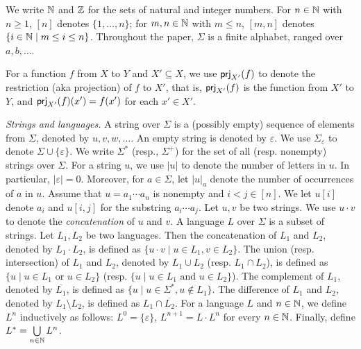 %

We write $\mathbb{N}$ and $\mathbb{Z}$ for the sets of natural and integer numbers. For $n \in \mathbb{N}$ with $n \ge 1$, $[n]$ denotes $\{1, \ldots, n\}$; for $m,n \in \mathbb{N}$ with $m \le n$,  $[m, n]$ denotes $\{ i \in \mathbb{N} \mid m \le i \le n \}$. Throughout the paper, $\Sigma$ is a finite alphabet, ranged over $a,b,\ldots$.  

For a function $f$ from $X$ to $Y$ and $X' \subseteq X$, we use ${\sf prj}_{X'}(f)$ to denote the restriction (aka projection) of $f$ to $X'$, that is, ${\sf prj}_{X'}(f)$ is the function from $X'$ to $Y$, and ${\sf prj}_{X'}(f)(x') = f(x')$ for each $x' \in X'$.

\medskip
\noindent 
\emph{Strings and languages.}
A string over $\Sigma$ is a (possibly empty) sequence of elements from $\Sigma$,
denoted by $u, v, w, \ldots$. An empty string is denoted by $\varepsilon$. We use $\Sigma_\varepsilon$ to denote $\Sigma \cup \{\varepsilon\}$. We write $\Sigma^*$ (resp., $\Sigma^+$) for the set of all (resp. nonempty) strings over $\Sigma$.
For a string $u$, we use $|u|$ to denote the number of letters in $u$. In particular, $|\varepsilon|=0$. 
Moreover, for $a \in \Sigma$, let $|u|_a$ denote the number of occurrences of $a$ in $u$. 
Assume that $u=a_1\cdots a_{n}$ is nonempty and $i<j \in [n]$. %
We let $u[i]$ denote $a_i$ and $u[i,j]$ for the substring %
$a_i\cdots a_j$. 
%
Let $u, v$ be two strings. We use $u \cdot v$ to denote the \emph{concatenation} of $u$ and $v$. A language $L$ over $\Sigma$ is a subset of strings.  
Let $L_1, L_2$ be two languages. Then the concatenation of $L_1$ and $L_2$, denoted by $L_1 \cdot L_2$,  is defined as $\{u \cdot v \mid u \in L_1, v \in L_2\}$. The union (resp. intersection) of $L_1$ and $L_2$, denoted by $L_1 \cup L_2$  (resp. $L_1 \cap L_2$), is defined as $\{u \mid u \in L_1 \mbox{ or } u \in L_2\}$ (resp. $\{u \mid u \in L_1 \mbox{ and } u \in L_2\}$). The complement of $L_1$, denoted by $\overline{L_1}$, is defined as $\{u \mid u \in \Sigma^*, u \not \in L_1\}$. 
The difference of $L_1$ and $L_2$, denoted by $L_1 \setminus L_2$, is defined as $L_1 \cap \overline{L_2}$. 
For a language $L$ and $n \in \mathbb{N}$, we define $L^n$ inductively as follows: $L^0= \{\varepsilon\}$, $L^{n+1} = L \cdot L^n$ for every $n \in \mathbb{N}$. 
Finally, define $L^* = \bigcup \limits_{n \in \mathbb{N}} L^n$.

